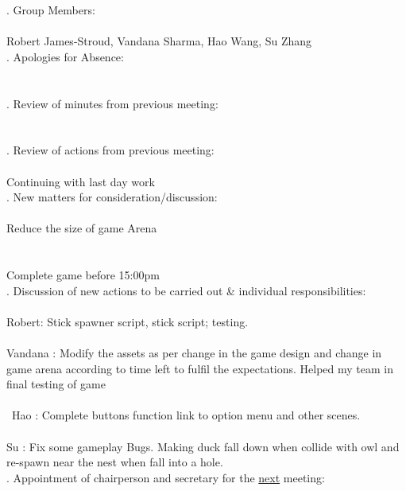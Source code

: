 \documentclass{article}
\begin{document}
. Group Members: \\\\ \indent Robert James-Stroud, Vandana Sharma, Hao Wang, Su Zhang \\

. Apologies for Absence: \\\\ \indent   \\

. Review of minutes from previous meeting: \\\\ \indent  \\

. Review of actions from previous meeting: \\\\ \indent  Continuing with last day work\\

. New matters for consideration/discussion: \\\\ \indent  Reduce the size of game Arena \\\\\\ \indent  Complete game before 15:00pm\\

. Discussion of new actions to be carried out \& individual responsibilities: \\\\ \indent Robert: Stick spawner script,  stick script; testing. \\\\
\indent Vandana : Modify the assets as per change in the game design and change in game arena according to time left to fulfil the expectations. Helped my team in final testing of game \\\\\
\indent Hao : Complete buttons function link to option menu and other scenes.  \\\\
\indent Su : Fix some gameplay Bugs. Making duck fall down when collide with owl and re-spawn near the nest when fall into a hole.\\

. Appointment of chairperson and secretary for the \underline{next} meeting: \\\\ \indent  \\
\end{document}
